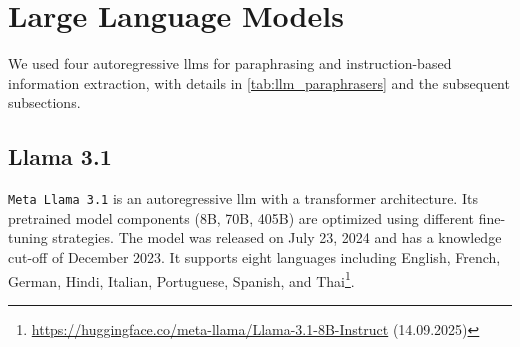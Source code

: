 \chapter{Large Language Models}
\label{app:language_models}

We used four autoregressive \acp{llm} for paraphrasing and instruction-based information extraction, with details in \autoref{tab:llm_paraphrasers} and the subsequent subsections.

\begin{table}[h]
\centering
\caption{Collection of multilingual \acp{llm} used for paraphrasing\protect\footnotemark.}
\label{tab:llm_paraphrasers}
\end{table}

\section{Llama 3.1}

\texttt{Meta Llama 3.1} is an autoregressive \ac{llm} with a transformer architecture.
Its pretrained model components  (8B, 70B, 405B) are optimized using different fine-tuning strategies.
The model was released on July 23, 2024 and has a knowledge cut-off of December 2023.
It supports eight languages including English, French, German, Hindi, Italian, Portuguese, Spanish, and Thai\footnote{\url{https://huggingface.co/meta-llama/Llama-3.1-8B-Instruct} (14.09.2025)}.

